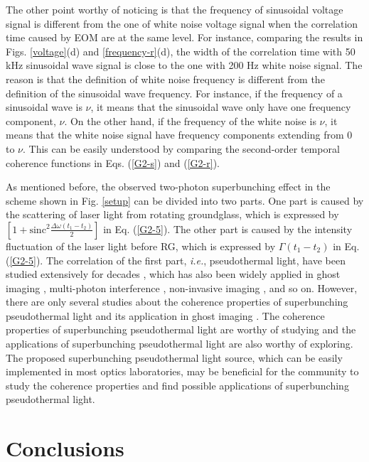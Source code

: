 \documentclass[12pt]{iopart}
\begin{document}
The other point worthy of noticing is that the frequency of sinusoidal voltage signal is different from the one of white noise voltage signal when the correlation time caused by EOM are at the same level. For instance, comparing the results in Figs. \ref{voltage}(d)  and \ref{frequency-r}(d), the width of the correlation time with 50 kHz sinusoidal wave signal is close to the one with 200 Hz white noise signal. The reason is that the definition of white noise frequency is different from the definition of the sinusoidal wave frequency. For instance, if the frequency of a sinusoidal wave is $\nu$, it means that the sinusoidal wave only have one frequency component, $\nu$. On the other hand, if the frequency of the white noise is $\nu$, it means that the white noise signal have frequency components extending from 0 to $\nu$. This can be easily understood by comparing the second-order temporal coherence functions in Eqs. (\ref{G2-s}) and (\ref{G2-r}).  

As mentioned before, the observed two-photon superbunching effect in the scheme shown in Fig. \ref{setup} can be divided into two parts. One part is caused by the scattering of laser light from rotating groundglass, which is expressed by $ [1+ \text{sinc}^2\frac{\Delta \omega (t_1-t_2)}{2}]$ in Eq. (\ref{G2-5}). The other part is caused by the intensity fluctuation of the laser light before RG, which is expressed by $\Gamma(t_1-t_2)$ in Eq. (\ref{G2-5}).  The correlation of the first part, \textit{i.e.}, pseudothermal light, have been studied extensively for decades \cite{goodman-speckle}, which has also been widely applied in ghost imaging \cite{valencia,ferri,crosby}, multi-photon interference \cite{scarcelli,chen}, non-invasive imaging \cite{bertolotti,katz}, and so on. However, there are only several studies about the coherence properties of superbunching pseudothermal light \cite{zhou, liu-5} and its application in ghost imaging \cite{liu-6}. The coherence properties of superbunching pseudothermal light are worthy of studying and the applications of superbunching pseudothermal light are also worthy of exploring. The proposed superbunching pseudothermal light source, which can be easily implemented in most optics laboratories, may be beneficial for the community to study the coherence properties and find possible applications of superbunching pseudothermal light.
 
\section{Conclusions}
\end{document}
